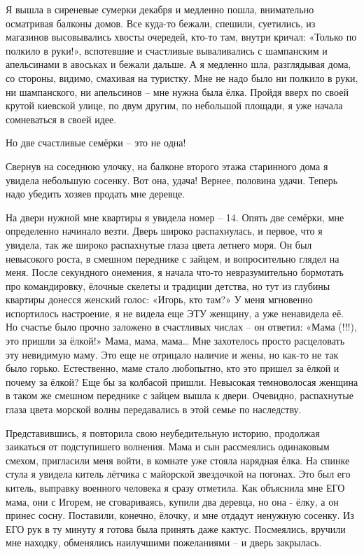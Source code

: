 Я вышла в сиреневые сумерки декабря и медленно пошла, внимательно осматривая
балконы домов. Все куда-то бежали, спешили, суетились, из магазинов
высовывались хвосты очередей, кто-то там, внутри кричал: «Только по полкило в
руки!», вспотевшие и счастливые вываливались с шампанским и апельсинами в
авоськах и бежали дальше. А я медленно шла, разглядывая дома, со стороны,
видимо, смахивая на туристку. Мне не надо было ни полкило в руки, ни
шампанского, ни апельсинов – мне нужна была ёлка. Пройдя вверх по своей крутой
киевской улице, по двум другим, по небольшой площади, я уже начала сомневаться
в своей идее.

Но две счастливые семёрки – это не одна!

Свернув на соседнюю улочку, на балконе второго этажа старинного дома я увидела
небольшую сосенку. Вот она, удача! Вернее, половина удачи. Теперь надо убедить
хозяев продать мне деревце.

На двери нужной мне квартиры я увидела номер – 14. Опять две семёрки, мне
определенно начинало везти. Дверь широко распахнулась, и первое, что я увидела,
так же широко распахнутые глаза цвета летнего моря. Он был невысокого роста, в
смешном переднике с зайцем, и вопросительно глядел на меня. После секундного
онемения, я начала что-то невразумительно бормотать про командировку, ёлочные
скелеты и традиции детства, но тут из глубины квартиры донесся женский голос:
«Игорь, кто там?» У меня мгновенно испортилось настроение, я не видела еще ЭТУ
женщину, а уже ненавидела её. Но счастье было прочно заложено в счастливых
числах – он ответил: «Мама (!!!), это пришли за ёлкой!» Мама, мама, мама… Мне
захотелось просто расцеловать эту невидимую маму. Это еще не отрицало наличие и
жены, но как-то не так было горько. Естественно, маме стало любопытно, кто это
пришел за ёлкой и почему за ёлкой? Еще бы за колбасой пришли. Невысокая
темноволосая женщина в таком же смешном переднике с зайцем вышла к двери.
Очевидно, распахнутые глаза цвета морской волны передавались в этой семье по
наследству.

Представившись, я повторила свою неубедительную историю, продолжая заикаться от
подступишего волнения. Мама и сын рассмеялись одинаковым смехом, пригласили
меня войти, в комнате уже стояла нарядная ёлка. На спинке стула я увидела
китель лётчика с майорской звездочкой на погонах. Это был его китель, выправку
военного человека я сразу отметила. Как объяснила мне ЕГО мама, они с Игорем,
не сговариваясь, купили два деревца, но она - ёлку, а он принес сосну.
Поставили, конечно, ёлочку, и мне отдадут ненужную сосенку. Из ЕГО рук в ту
минуту я готова была принять даже кактус. Посмеялись, вручили мне находку,
обменялись наилучшими пожеланиями – и дверь закрылась.

